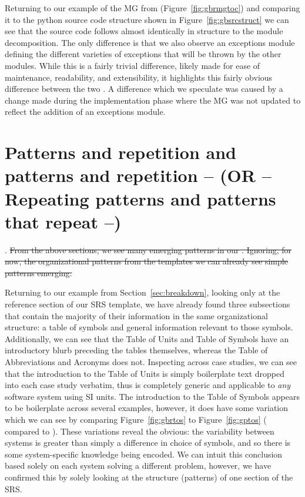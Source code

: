 Returning to our example of the MG from \gb{} (Figure~\ref{fig:gbrmgtoc}) and 
comparing it to the python source code structure shown in 
Figure~\ref{fig:gbsrcstruct} we can see that the source code follows almost 
identically in structure to the module decomposition. The only difference is 
that we also observe an exceptions module defining the different varieties of 
exceptions that will be thrown by the other modules. While this is a fairly 
trivial difference, likely made for ease of maintenance, readability, and 
extensibility, it highlights this fairly obvious difference between the two 
\sfs{}. A difference which we speculate was caused by a change made during the 
implementation phase where the MG was not updated to reflect the addition of an 
exceptions module.



\section{Patterns and repetition and patterns and repetition -- (OR -- 
Repeating patterns and patterns that repeat --)}
\label{sec:patterns}

. \sout{From the above sections, we see many emerging 
patterns 
in our \sfs{}. Ignoring, 
for now, the organizational patterns from the \smithea{} templates we can 
already see simple patterns emerging.}

Returning to our example from Section~\ref{sec:breakdown}, looking only at the 
reference section of our SRS template, we have already found
three subsections that contain the majority of their information in the same
organizational structure: a table of symbols and general information relevant 
to those symbols. Additionally, we can see that the Table of Units and Table of 
Symbols have an introductory blurb preceding the tables themselves, whereas the 
Table of Abbreviations and Acronyms does not. Inspecting across case studies, 
we can see that the introduction to the Table of Units is simply boilerplate 
text dropped into each case study verbatim, thus is completely generic and 
applicable to \emph{any} software system using SI units. The introduction to 
the Table of Symbols appears to be boilerplate across several examples, 
however, it does have some variation which we can see by comparing 
Figure~\ref{fig:gbrtos} to Figure~\ref{fig:gptos} (\gb{} compared to \gp{}).
These variations reveal the obvious: the variability between systems is greater 
than simply a difference in choice of symbols, and so there is some 
system-specific knowledge being encoded. We can intuit this conclusion based 
solely on each system solving a different problem, however, we have confirmed 
this by solely looking at the structure (patterns) of one section of the SRS.

